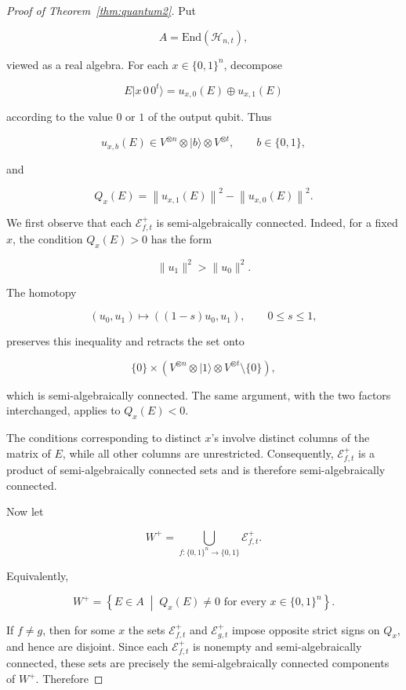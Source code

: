 \documentclass[10pt,a4paper]{amsart}
\newcommand{\End}{\mathrm{End}}
\begin{document}
\begin{proof}[Proof of Theorem~\ref{thm:quantum2}]
Put

$$
A=\End(\mathcal H_{n,t}),
$$

viewed as a real algebra. For each \(x\in\{0,1\}^{n}\), decompose

$$
E\lvert x\,0\,0^{t}\rangle
=
u_{x,0}(E)\oplus u_{x,1}(E)
$$

according to the value \(0\) or \(1\) of the output qubit. Thus

$$
u_{x,b}(E)\in
V^{\otimes n}\otimes \lvert b\rangle\otimes V^{\otimes t},
\qquad b\in\{0,1\},
$$

and

$$
Q_x(E)
=
\left\|u_{x,1}(E)\right\|^{2}
-
\left\|u_{x,0}(E)\right\|^{2}.
$$

We first observe that each \(\mathcal E^{+}_{f,t}\) is semi-algebraically
connected. Indeed, for a fixed \(x\), the condition \(Q_x(E)>0\) has the
form

$$
\|u_1\|^{2}>\|u_0\|^{2}.
$$

The homotopy

$$
(u_0,u_1)\longmapsto ((1-s)u_0,u_1),
\qquad 0\leq s\leq1,
$$

preserves this inequality and retracts the set onto

$$
\{0\}\times
\left(
V^{\otimes n}\otimes\lvert1\rangle\otimes V^{\otimes t}
\setminus\{0\}
\right),
$$

which is semi-algebraically connected. The same argument, with the two
factors interchanged, applies to \(Q_x(E)<0\).

The conditions corresponding to distinct \(x\)'s involve distinct columns
of the matrix of \(E\), while all other columns are unrestricted.
Consequently, \(\mathcal E^{+}_{f,t}\) is a product of semi-algebraically
connected sets and is therefore semi-algebraically connected.

Now let

$$
W^{+}
=
\bigcup_{f:\{0,1\}^{n}\to\{0,1\}}
\mathcal E^{+}_{f,t}.
$$

Equivalently,

$$
W^{+}
=
\left\{
E\in A
\;\middle|\;
Q_x(E)\neq0
\text{ for every }x\in\{0,1\}^{n}
\right\}.
$$

If \(f\neq g\), then for some \(x\) the sets
\(\mathcal E^{+}_{f,t}\) and \(\mathcal E^{+}_{g,t}\) impose opposite
strict signs on \(Q_x\), and hence are disjoint. Since each
\(\mathcal E^{+}_{f,t}\) is nonempty and semi-algebraically connected,
these sets are precisely the semi-algebraically connected components of
\(W^{+}\). Therefore


\end{proof}
\end{document}
